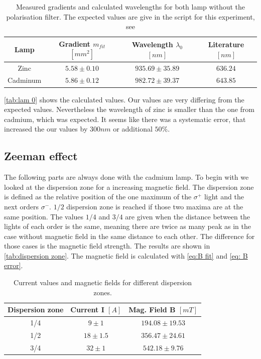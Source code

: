 \documentclass[]{article}
\begin{document}
\begin{table}[H]
\centering
\begin{tabular}{c|c|c|c}
Lamp & Gradient $m_{fit}$ $[mm^2]$ & Wavelength $\lambda_0$ $[nm]$ & Literature $[nm]$ \\ \hline\hline
Zinc & $5.58 \pm 0.10$  & $935.69 \pm 35.89$ & $636.24$ \\ \hline
Cadminum & $5.86 \pm 0.12$  & $982.72 \pm 39.37$ & $643.85$
\end{tabular}
\caption{Measured gradients and calculated wavelengths for both lamp without the polarisation filter. The expected values are give in the script for this experiment, see \cite{wiki}}
\label{tab:lam 0}
\end{table}

\autoref{tab:lam 0} shows the calculated values. Our values are very differing from the expected values. Nevertheless the wavelength of zinc is smaller than the one from cadmium, which was expected. It seems like there was a systematic error, that increased the our values by $300nm$ or additional $50\%$.


\subsection{Zeeman effect}
The following parts are always done with the cadmium lamp. To begin with we looked at the dispersion zone for a increasing magnetic field. The dispersion zone is defined as the relative position of the one maximum of the $\sigma^+$ light and the next orders $\sigma^-$. $1/2$ dispersion zone is reached if those two maxima are at the same position. The values $1/4$ and $3/4$ are given when the distance between the lights of each order is the same, meaning there are twice as many peak as in the case without magnetic field in the same distance to each other. The difference for those cases is the magnetic field strength. The results are shown in \autoref{tab:dispersion zone}. The magnetic field is calculated with \autoref{eq:B fit} and \autoref{eq: B error}.

\begin{table}[H]
\centering
\begin{tabular}{c|c|c}
Dispersion zone & Current I $[A]$ & Mag. Field B $[mT]$ \\ \hline\hline
1/4 & $9 \pm 1$  & $194.08 \pm 19.53$  \\ \hline
1/2 & $18 \pm 1.5$  & $356.47 \pm 24.61$  \\ \hline
3/4 & $32 \pm 1$  & $542.18 \pm 9.76$ 
\end{tabular}
\caption{ Current values and magnetic fields for different dispersion zones. }
\label{tab:dispersion zone}
\end{table}
\end{document}
